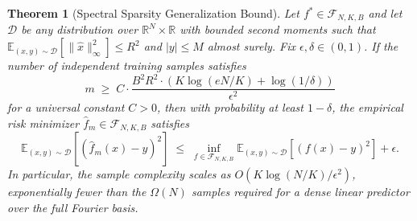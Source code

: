 \documentclass[11pt]{article}
\newtheorem{theorem}{Theorem}
\begin{document}
\begin{theorem}[Spectral Sparsity Generalization Bound]
\label{thm:sparsity}
Let $f^* \in \mathcal{F}_{N,K,B}$ and let $\mathcal{D}$ be any distribution
over $\mathbb{R}^N \times \mathbb{R}$ with bounded second moments such that
$\mathbb{E}_{(x,y) \sim \mathcal{D}}[\|\widehat{x}\|_\infty^2] \leq R^2$
and $|y| \leq M$ almost surely. Fix $\epsilon, \delta \in (0, 1)$. If the
number of independent training samples satisfies
\begin{equation}
m \;\geq\; C \cdot \frac{B^2 R^2 \cdot \left( K \log(eN/K) + \log(1/\delta) \right)}{\epsilon^2}
\end{equation}
for a universal constant $C > 0$, then with probability at least $1 - \delta$,
the empirical risk minimizer $\hat{f}_m \in \mathcal{F}_{N,K,B}$ satisfies
\begin{equation}
\mathbb{E}_{(x,y) \sim \mathcal{D}}[(\hat{f}_m(x) - y)^2]
\;\leq\; \inf_{f \in \mathcal{F}_{N,K,B}} \mathbb{E}_{(x,y) \sim \mathcal{D}}[(f(x) - y)^2] + \epsilon.
\end{equation}
In particular, the sample complexity scales as $O(K \log(N/K) / \epsilon^2)$,
exponentially fewer than the $\Omega(N)$ samples required for a dense linear
predictor over the full Fourier basis.
\end{theorem}
\end{document}
